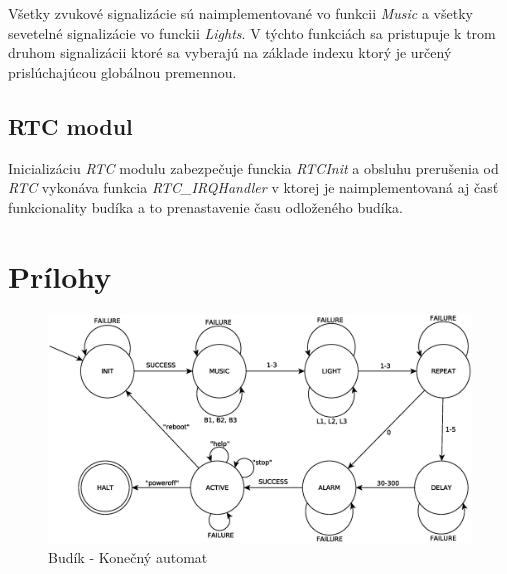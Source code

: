 \documentclass[11pt,a4paper]{article}
\begin{document}
        \indent Všetky zvukové signalizácie sú naimplementované vo funkcii \textit{Music} a všetky sevetelné signalizácie vo funckii \textit{Lights}. V týchto funkciách sa pristupuje k trom druhom signalizácii ktoré sa vyberajú na základe indexu ktorý je určený prislúchajúcou globálnou premennou.

    \subsection{RTC modul}

        \indent Inicializáciu \textit{RTC} modulu zabezpečuje funckia \textit{RTCInit} a obsluhu prerušenia od \textit{RTC} vykonáva funkcia \textit{RTC\_IRQHandler} v ktorej je naimplementovaná aj časť funkcionality budíka a to prenastavenie času odloženého budíka.
  
\newpage
\section{Prílohy}

\begin{figure}[H]
    \centering
    \includegraphics[scale=0.55]{img/fsm.eps}
    \caption{Budík - Konečný automat}
    \label{fig:fsm}
\end{figure}

\newpage %

\makeatletter
\makeatother

\begin{flushleft}
    
\end{flushleft}
\end{document}
